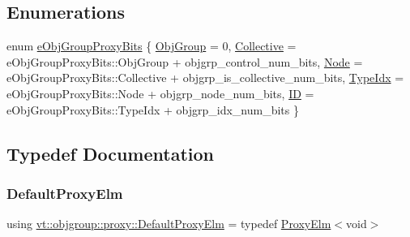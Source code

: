 \subsection*{Enumerations}
\begin{DoxyCompactItemize}
\item 
enum \hyperlink{namespacevt_1_1objgroup_1_1proxy_a5cfde1a666e49070fcc0312e51d53777}{e\+Obj\+Group\+Proxy\+Bits} \{ \newline
\hyperlink{namespacevt_1_1objgroup_1_1proxy_a5cfde1a666e49070fcc0312e51d53777a235be9f56eb1337ea20d2937ffb7a8a4}{Obj\+Group} = 0, 
\hyperlink{namespacevt_1_1objgroup_1_1proxy_a5cfde1a666e49070fcc0312e51d53777ab1d0e2d0ac577126529814c35a32c003}{Collective} = e\+Obj\+Group\+Proxy\+Bits\+:\+:Obj\+Group + objgrp\+\_\+control\+\_\+num\+\_\+bits, 
\hyperlink{namespacevt_1_1objgroup_1_1proxy_a5cfde1a666e49070fcc0312e51d53777a179829552544d5bb4b3bac56d953e06a}{Node} = e\+Obj\+Group\+Proxy\+Bits\+:\+:Collective + objgrp\+\_\+is\+\_\+collective\+\_\+num\+\_\+bits, 
\hyperlink{namespacevt_1_1objgroup_1_1proxy_a5cfde1a666e49070fcc0312e51d53777a3993e012fc4525e4ddc1a6e30a75714c}{Type\+Idx} = e\+Obj\+Group\+Proxy\+Bits\+:\+:Node + objgrp\+\_\+node\+\_\+num\+\_\+bits, 
\newline
\hyperlink{namespacevt_1_1objgroup_1_1proxy_a5cfde1a666e49070fcc0312e51d53777a6de04ce539708519a851efd1640f2b48}{ID} = e\+Obj\+Group\+Proxy\+Bits\+:\+:Type\+Idx + objgrp\+\_\+idx\+\_\+num\+\_\+bits
 \}
\end{DoxyCompactItemize}


\subsection{Typedef Documentation}
\mbox{\label{namespacevt_1_1objgroup_1_1proxy_ae207233400f23aa10c30217cdb369c54}} 
\subsubsection{\texorpdfstring{Default\+Proxy\+Elm}{DefaultProxyElm}}
{\footnotesize\ttfamily using \hyperlink{namespacevt_1_1objgroup_1_1proxy_ae207233400f23aa10c30217cdb369c54}{vt\+::objgroup\+::proxy\+::\+Default\+Proxy\+Elm} = typedef \hyperlink{structvt_1_1objgroup_1_1proxy_1_1_proxy_elm}{Proxy\+Elm}$<$void$>$}

